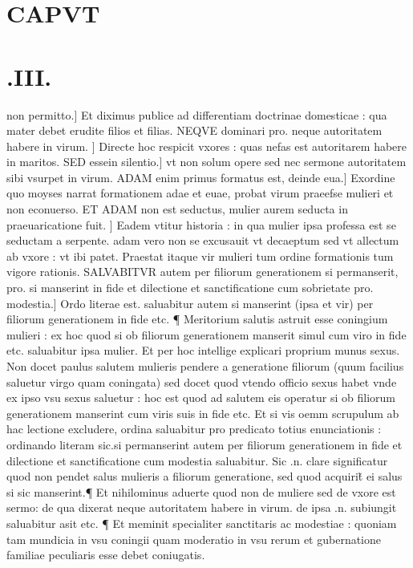 \documentclass{article}
\begin{document}
\begin{pages}
\section*{CAPVT }
\section*{.III. }
\marginpar{[ p.142 ]}\pstart non permitto.] Et diximus publice  ad differentiam doctrinae domesticae : qua mater debet erudite filios et filias. NEQVE dominari pro. neque  autoritatem habere  in virum. ] Directe hoc respicit vxores : quas nefas est autoritarem habere in maritos. SED essein silentio.] vt non solum opere sed nec sermone autoritatem sibi vsurpet in virum. ADAM enim primus formatus est, deinde eua.] Exordine quo moyses narrat formationem adae et euae, probat virum praeefse mulieri et non econuerso. ET ADAM non est seductus, mulier aurem seducta in praeuaricatione fuit. ] Eadem vtitur historia : in qua mulier ipsa professa est se seductam a serpente. adam vero non se excusauit vt decaeptum  sed vt allectum ab vxore : vt ibi patet. Praestat itaque  vir mulieri tum ordine formationis  tum vigore rationis. SALVABITVR autem per filiorum generationem si permanserit, pro. si manserint  in fide et dilectione et sanctificatione cum sobrietate pro. modestia.] Ordo literae est. saluabitur autem si manserint (ipsa et vir) per filiorum generationem in fide etc. ¶ Meritorium salutis astruit esse coningium mulieri : ex hoc quod si ob filiorum generationem manserit simul cum viro in fide etc. saluabitur ipsa mulier. Et per hoc intellige explicari proprium munus sexus. Non docet paulus salutem mulieris pendere a generatione filiorum (quum facilius saluetur virgo quam coningata) sed docet quod vtendo officio sexus  habet vnde ex ipso vsu sexus saluetur : hoc est quod ad salutem eis operatur si ob filiorum generationem manserint cum viris suis in fide etc.  Et si vis oemm scrupulum ab hac lectione excludere, ordina saluabitur pro predicato totius enunciationis : ordinando literam sic.si permanserint autem per filiorum generationem in fide et dilectione et sanctificatione cum modestia  saluabitur. Sic .n. clare significatur quod non pendet salus mulieris a filiorum generatione, sed quod acquirit̃ ei salus si sic manserint.¶ Et nihilominus aduerte quod non de muliere sed de vxore est sermo: de qua dixerat neque  autoritatem habere in virum. de ipsa .n. subiungit saluabitur asit etc.  ¶ Et meminit specialiter sanctitaris ac modestiae : quoniam tam mundicia in vsu coningii quam moderatio in vsu rerum et gubernatione familiae  peculiaris esse debet coniugatis.  \pend

\end{pages}
\end{document}
